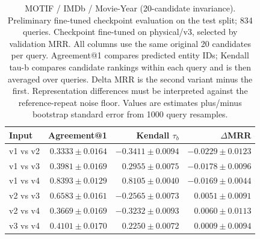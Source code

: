 \begin{table}[t]
\centering
\small
\begin{tabular}{lrrr}
\toprule
Input & Agreement@1 & Kendall $\tau_b$ & $\Delta$MRR \\
\midrule
v1 vs v2 & $0.3333 \pm 0.0164$ & $-0.3411 \pm 0.0094$ & $-0.0229 \pm 0.0123$ \\
v1 vs v3 & $0.3981 \pm 0.0169$ & $0.2955 \pm 0.0075$ & $-0.0178 \pm 0.0096$ \\
v1 vs v4 & $0.8393 \pm 0.0129$ & $0.8105 \pm 0.0040$ & $-0.0169 \pm 0.0044$ \\
v2 vs v3 & $0.6583 \pm 0.0161$ & $-0.2565 \pm 0.0073$ & $0.0051 \pm 0.0091$ \\
v2 vs v4 & $0.3669 \pm 0.0169$ & $-0.3232 \pm 0.0093$ & $0.0060 \pm 0.0113$ \\
v3 vs v4 & $0.4101 \pm 0.0170$ & $0.2250 \pm 0.0072$ & $0.0009 \pm 0.0094$ \\
\bottomrule
\end{tabular}
\caption{MOTIF / IMDb / Movie-Year (20-candidate invariance). Preliminary fine-tuned checkpoint evaluation on the test split; 834 queries. Checkpoint fine-tuned on physical/v3, selected by validation MRR. All columns use the same original 20 candidates per query. Agreement@1 compares predicted entity IDs; Kendall tau-b compares candidate rankings within each query and is then averaged over queries. Delta MRR is the second variant minus the first. Representation differences must be interpreted against the reference-repeat noise floor. Values are estimates plus/minus bootstrap standard error from 1000 query resamples.}
\label{tab:motif-movie_year-invariance}
\end{table}
